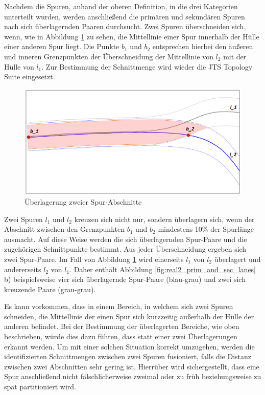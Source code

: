 Nachdem die Spuren, anhand der oberen Definition, in die drei Kategorien unterteilt wurden, werden
anschließend die primären und sekundären Spuren nach sich überlagernden Paaren durchsucht.
Zwei Spuren überschneiden sich, wenn, wie in
Abbildung \ref{fig:real2_lane_crossing} zu sehen, die Mittellinie einer Spur innerhalb der Hülle einer
anderen Spur liegt. Die Punkte $b_1$ und $b_2$ entsprechen hierbei den äußeren und inneren Grenzpunkten
der Überschneidung der Mittellinie von $l_2$ mit der Hülle von $l_1$. Zur Bestimmung der Schnittmenge
wird wieder die JTS Topology Suite eingesetzt.

\begin{figure}[H]
    \centering
    \includegraphics[width=0.5\linewidth]{resources/img/umsetzung/U2/lane_crossing}
    \caption{Überlagerung zweier Spur-Abschnitte}
    \label{fig:real2_lane_crossing}
\end{figure}

Zwei Spuren $l_1$ und $l_2$ kreuzen sich nicht nur, sondern überlagern sich, wenn der Abschnitt zwischen
den Grenzpunkten $b_1$ und $b_2$ mindestens 10\% der Spurlänge ausmacht. Auf diese Weise werden die
sich überlagernden Spur-Paare und die zugehörigen Schnittpunkte bestimmt.
Aus jeder Überschneidung ergeben sich zwei Spur-Paare.
Im Fall von Abbildung \ref{fig:real2_lane_crossing} wird einerseits $l_1$ von $l_2$ überlagert und andererseits
$l_2$ von $l_1$.
Daher enthält Abbildung \ref{fig:real2_prim_and_sec_lanes} b) beispielsweise vier sich überlagernde Spur-Paare
(blau-grau) und zwei sich kreuzende Paare (grau-grau).

Es kann vorkommen, dass in einem Bereich, in welchem sich zwei Spuren schneiden,
die Mittellinie der einen Spur sich kurzzeitig außerhalb der Hülle der anderen befindet. Bei der Bestimmung
der überlagerten Bereiche, wie oben beschrieben, würde dies dazu führen, dass statt einer zwei Überlagerungen
erkannt werden. Um mit einer solchen Situation korrekt umzugehen, werden die identifizierten Schnittmengen
zwischen zwei Spuren fusioniert, falls die Distanz zwischen zwei Abschnitten sehr gering ist.
Hierrüber wird sichergestellt, dass eine Spur anschließend nicht fälschlicherweise zweimal
oder zu früh beziehungsweise zu spät partitioniert wird.

